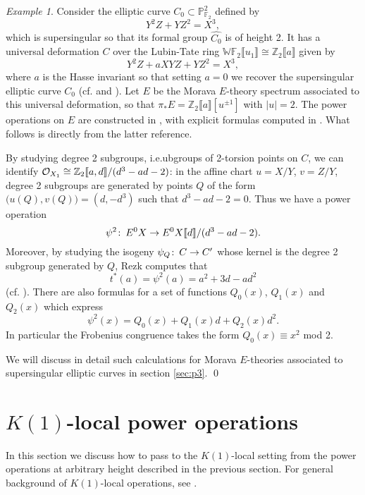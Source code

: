 \documentclass{gtpart}
\theoremstyle{definition}
\theoremstyle{remark}
\newtheorem{exam}[thm]{Example}
\def\co{\colon\thinspace}
\newcommand{\mb}[1]{\mathbb{#1}}
\newcommand{\CO}{{\cal O}}
\begin{document}
\begin{exam}
\label{ex:h2p2}
 Consider the elliptic curve $C_0 \subset {\mb P}_{{\mb F}_2}^2$ defined by 
 \[
  Y^2 Z + Y Z^2 = X^3, 
 \]
 which is supersingular so that its formal group $\widehat{C_0}$ is of height 
 2.  It has a universal deformation $C$ over the Lubin-Tate ring 
 ${\mb W}{\mb F}_2 \llbracket u_1 \rrbracket \cong 
 {\mb Z}_2 \llbracket a \rrbracket$ given by 
 \[
  Y^2 Z + a X Y Z + Y Z^2 = X^3, 
 \]
 where $a$ is the Hasse invariant so that setting $a=0$ we recover the 
 supersingular elliptic curve $C_0$ (cf. \cite[2.2.10]{katzmazur} and 
 \cite[proposition 3.2]{tmf3}).  Let $E$ be the Morava $E$-theory spectrum 
 associated to this universal deformation, so that $\pi_* E = 
 {\mb Z}_2 \llbracket a \rrbracket [u^{\pm 1}]$ with $|u| = 2$.  The power 
 operations on $E$ are constructed in \cite[section 3]{Andu}, with explicit 
 formulas computed in \cite[sections 3 and 4]{h2p2}.  What follows is directly 
 from the latter reference.  

 By studying degree 2 subgroups, i.e.ubgroups of 2-torsion points 
 on $C$, we can identify $\CO_{X_1} \cong 
 {\mb Z}_2 \llbracket a,d \rrbracket / (d^3 - a d - 2)$: in the affine chart 
 $u = X/Y$, $v = Z/Y$, degree 2 subgroups are generated by points $Q$ of the 
 form $\big(u(Q), v(Q)\big) = (d, -d^3)$ such that $d^3 - a d - 2 = 0$.  Thus 
 we have a power operation 
 \[
  \psi^2\co E^0 X \to E^0 X \llbracket d \rrbracket / (d^3 - a d - 2).  
 \]
 Moreover, by studying the isogeny $\psi_Q\co C \to C'$ whose kernel is the 
 degree 2 subgroup generated by $Q$, Rezk computes that 
 \[
  t^* (a) = \psi^2 (a) = a^2 + 3 d - a d^2
 \]
 (cf. \cite[p.~6]{h2p2}).  There are also formulas for a set of functions 
 $Q_0(x)$, $Q_1(x)$ and $Q_2(x)$ which express 
 \[
  \psi^2 (x) = Q_0(x) + Q_1(x) d + Q_2(x) d^2.  
 \]
 In particular the Frobenius congruence takes the form $Q_0(x) \equiv x^2$ mod 
 2.  

 We will discuss in detail such calculations for Morava $E$-theories 
 associated to supersingular elliptic curves in section \ref{sec:p3}.  \qed
\end{exam}


\section{$K(1)$-local power operations}
\label{sec:K(1)}

In this section we discuss how to pass to the $K(1)$-local setting from the 
power operations at arbitrary height described in the previous section.  For 
general background of $K(1)$-local operations, see \cite{k1}.  
\end{document}
